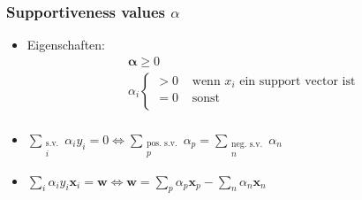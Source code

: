 \begin{frame}
    \frametitle{Supportiveness values $\alpha$}

    \begin{itemize}
        \item Eigenschaften:
            \begin{align*}
                & \boldsymbol{\alpha} \geq 0 \\
                & \alpha_i \begin{cases}
                    > 0 & \text{ wenn } x_i \text{ ein support vector ist} \\
                    = 0 & \text{ sonst} \\
                \end{cases} \\
            \end{align*}
        \item $ \sum\limits_{\substack{ \text{s.v.} \\ i}} \alpha_i y_i  = 0 \Leftrightarrow \sum\limits_{\substack{ \text{pos. s.v.} \\ p}} \alpha_p  = \sum\limits_{\substack{ \text{neg. s.v.} \\ n}} \alpha_n $
        \item $ \sum\limits_i \alpha_i y_i \boldsymbol{x}_i = \boldsymbol{w} \Leftrightarrow \boldsymbol{w} = \sum\limits_p \alpha_p \boldsymbol{x}_p - \sum\limits_n \alpha_n \boldsymbol{x}_n $
    \end{itemize}

    \vspace{3mm}


\end{frame}
